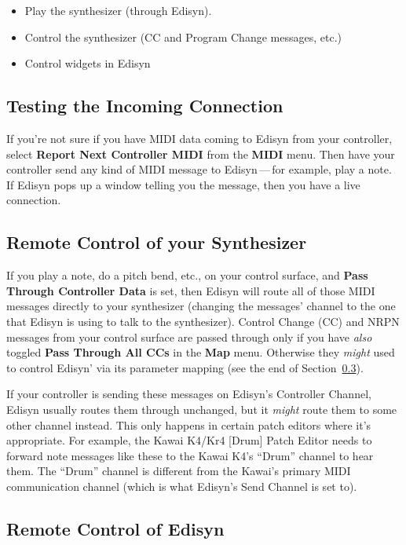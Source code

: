 \documentclass{article}
\begin{document}
\begin{itemize}
\item Play the synthesizer (through Edisyn).
\item Control the synthesizer (CC and Program Change messages, etc.)
\item Control widgets in Edisyn
\end{itemize}

\subsection{Testing the Incoming Connection}

If you're not sure if you have MIDI data coming to Edisyn from your controller, select {\bf Report Next Controller MIDI} from the {\bf MIDI} menu.  Then have your controller send any kind of MIDI message to Edisyn\,---\,for example, play a note.  If Edisyn pops up a window telling you the message, then you have a live connection.  

\subsection{Remote Control of your Synthesizer} 
If you play a note, do a pitch bend, etc., on your control surface, and {\bf Pass Through Controller Data} is set, then Edisyn will route all of those MIDI messages directly to your synthesizer (changing the messages' channel to the one that Edisyn is using to talk to the synthesizer).  Control Change (CC) and NRPN messages from your control surface are passed through only if you have {\it also} toggled {\bf Pass Through All CCs} in the {\bf Map} menu.  Otherwise they {\it might} used to control Edisyn' via its parameter mapping (see the end of Section~\ref{remotecontrolofedisyn}).

If your controller is sending these messages on Edisyn's Controller Channel, Edisyn usually routes them through unchanged, but it {\it might} route them to some other channel instead.  This only happens in certain patch editors where it's appropriate.  For example, the Kawai K4/Kr4 [Drum] Patch Editor needs to forward note messages like these to the Kawai K4's ``Drum'' channel to hear them.  The ``Drum'' channel is different from the Kawai's primary MIDI communication channel (which is what Edisyn's Send Channel is set to).  

\enlargethispage{0.5em}
\subsection{Remote Control of Edisyn} 
\label{remotecontrolofedisyn}
\end{document}
